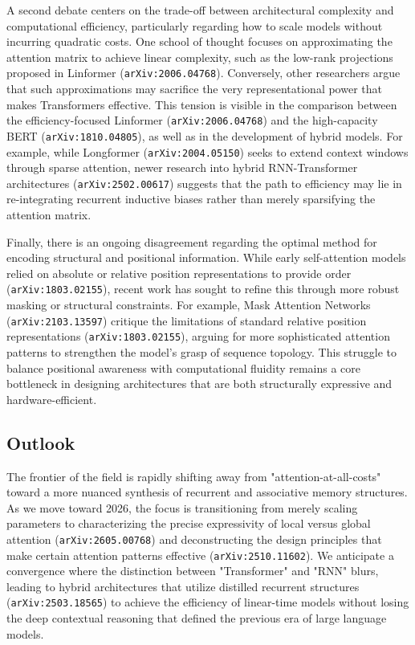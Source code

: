 \documentclass[11pt]{article}
\begin{document}
A second debate centers on the trade-off between architectural complexity and computational efficiency, particularly regarding how to scale models without incurring quadratic costs. One school of thought focuses on approximating the attention matrix to achieve linear complexity, such as the low-rank projections proposed in Linformer (\texttt{arXiv:2006.04768}). Conversely, other researchers argue that such approximations may sacrifice the very representational power that makes Transformers effective. This tension is visible in the comparison between the efficiency-focused Linformer (\texttt{arXiv:2006.04768}) and the high-capacity BERT (\texttt{arXiv:1810.04805}), as well as in the development of hybrid models. For example, while Longformer (\texttt{arXiv:2004.05150}) seeks to extend context windows through sparse attention, newer research into hybrid RNN-Transformer architectures (\texttt{arXiv:2502.00617}) suggests that the path to efficiency may lie in re-integrating recurrent inductive biases rather than merely sparsifying the attention matrix.

Finally, there is an ongoing disagreement regarding the optimal method for encoding structural and positional information. While early self-attention models relied on absolute or relative position representations to provide order (\texttt{arXiv:1803.02155}), recent work has sought to refine this through more robust masking or structural constraints. For example, Mask Attention Networks (\texttt{arXiv:2103.13597}) critique the limitations of standard relative position representations (\texttt{arXiv:1803.02155}), arguing for more sophisticated attention patterns to strengthen the model's grasp of sequence topology. This struggle to balance positional awareness with computational fluidity remains a core bottleneck in designing architectures that are both structurally expressive and hardware-efficient.

\subsection{Outlook}

The frontier of the field is rapidly shifting away from "attention-at-all-costs" toward a more nuanced synthesis of recurrent and associative memory structures. As we move toward 2026, the focus is transitioning from merely scaling parameters to characterizing the precise expressivity of local versus global attention (\texttt{arXiv:2605.00768}) and deconstructing the design principles that make certain attention patterns effective (\texttt{arXiv:2510.11602}). We anticipate a convergence where the distinction between "Transformer" and "RNN" blurs, leading to hybrid architectures that utilize distilled recurrent structures (\texttt{arXiv:2503.18565}) to achieve the efficiency of linear-time models without losing the deep contextual reasoning that defined the previous era of large language models.
\end{document}
